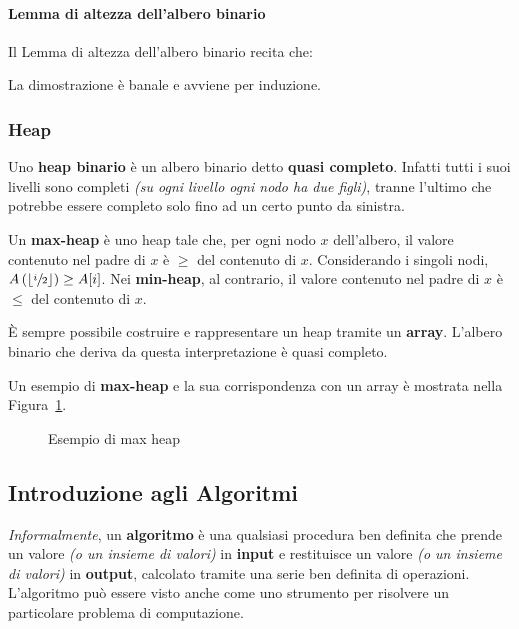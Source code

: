 \documentclass[italian, 10pt]{article}
\begin{document}
\paragraph{Lemma di altezza dell'albero binario}
\label{par:lemma-altezza-albero-binario}

Il Lemma di altezza dell'albero binario recita che:


La dimostrazione è banale e avviene per induzione.

\subsubsection{Heap}
\label{sec:heap}

Uno \textbf{heap binario} è un albero binario detto \textbf{quasi completo}.
Infatti tutti i suoi livelli sono completi \textit{(su ogni livello ogni nodo ha due figli)}, tranne l'ultimo che potrebbe essere completo solo fino ad un certo punto da sinistra.

Un \textbf{max-heap} è uno heap tale che, per ogni nodo \(x\) dell'albero, il valore contenuto nel padre di \(x\) è \(\geq\) del contenuto di \(x\).
Considerando i singoli nodi, \(A\left(\left\lfloor\sfrac{i}{2}\right\rfloor\right) \geq A[i]\).
Nei \textbf{min-heap}, al contrario, il valore contenuto nel padre di \(x\) è \(\leq\) del contenuto di \(x\).

\bigskip
È sempre possibile costruire e rappresentare un heap tramite un \textbf{array}.
L'albero binario che deriva da questa interpretazione è quasi completo.

\bigskip
Un esempio di \textbf{max-heap} e la sua corrispondenza con un array è mostrata nella Figura~\ref{fig:esempio-di-max-heap}.

\begin{figure}[htbp]
  \bigskip
  \centering
  \caption{Esempio di max heap}
  \label{fig:esempio-di-max-heap}
  \bigskip
\end{figure}

\subsection{Introduzione agli Algoritmi}

\textit{Informalmente}, un \textbf{algoritmo} è una qualsiasi procedura ben definita che prende un valore \textit{(o un insieme di valori)} in \textbf{input} e restituisce un valore \textit{(o un insieme di valori)} in \textbf{output}, calcolato tramite una serie ben definita di operazioni.
L'algoritmo può essere visto anche come uno strumento per risolvere un particolare problema di computazione.
\end{document}
